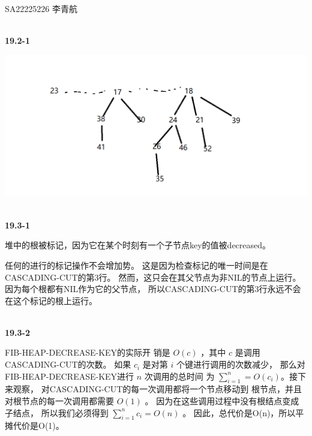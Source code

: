 \documentclass[UTF8]{ctexart}
\begin{document}
    SA22225226 李青航

    ~\\
    \noindent\textbf{19.2-1}

    \includegraphics{1.png}

    ~\\
    \noindent\textbf{19.3-1}

    堆中的根被标记，因为它在某个时刻有一个子节点key的值被decreased。

    任何的进行的标记操作不会增加势。
    这是因为检查标记的唯一时间是在CASCADING-CUT的第3行。
    然而，这只会在其父节点为非NIL的节点上运行。
    因为每个根都有NIL作为它的父节点，
    所以CASCADING-CUT的第3行永远不会在这个标记的根上运行。
    
    ~\\
    \noindent\textbf{19.3-2}

    FIB-HEAP-DECREASE-KEY的实际开
    销是 $O(c)$ ，其中 $c$ 是调用CASCADING-CUT的次数。
    如果 $c_i$ 是对第 $i$ 个键进行调用的次数减少，
    那么对FIB-HEAP-DECREASE-KEY进行 $n$ 次调用的总时间
    为 $\sum ^{n}_{i=1}= O(c_i)$。接下来观察，
    对CASCADING-CUT的每一次调用都将一个节点移动到
    根节点，并且对根节点的每一次调用都需要 $O(1)$ 。
    因为在这些调用过程中没有根结点变成子结点，
    所以我们必须得到 $\sum ^{n}_{i=1} c_i = O(n)$ 。
    因此，总代价是O(n)，所以平摊代价是O(1)。
\end{document}
